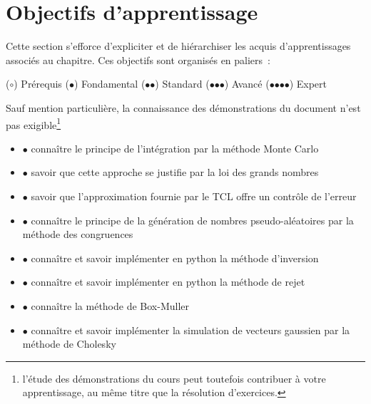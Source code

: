 \chapter{Objectifs d'apprentissage}\label{V-objectifs-dapprentissage}

Cette section s'efforce d'expliciter et de hiérarchiser les acquis
d'apprentissages associés au chapitre. Ces objectifs sont organisés en
paliers~:

($\mathord{\boldsymbol{\circ}}$) Prérequis ($\mathord{\bullet}$)
Fondamental ($\mathord{\bullet}\mathord{\bullet}$) Standard
($\mathord{\bullet}\mathord{\bullet}\mathord{\bullet}$) Avancé
($\mathord{\bullet}\mathord{\bullet}\mathord{\bullet}\mathord{\bullet}$)
Expert

Sauf mention particulière, la connaissance des démonstrations du
document n'est pas exigible\footnote{l'étude des démonstrations du cours
  peut toutefois contribuer à votre apprentissage, au même titre que la
  résolution d'exercices.}

\label{V-intuxe9grale-de-monte-carlo}

\begin{itemize}
\tightlist
\item
  $\mathord{\bullet}$ connaître le principe de l'intégration par la
  méthode Monte Carlo
\item
  $\mathord{\bullet}$ savoir que cette approche se justifie par la loi
  des grands nombres
\item
  $\mathord{\bullet}$ savoir que l'approximation fournie par le TCL
  offre un contrôle de l'erreur
\end{itemize}

\label{V-guxe9nuxe9ration-de-nombres-pseudo-aluxe9atoires}

\begin{itemize}
\tightlist
\item
  $\mathord{\bullet}$ connaître le principe de la génération de nombres
  pseudo-aléatoires par la méthode des congruences
\end{itemize}

\label{V-muxe9thodes-de-simulation-de-v.a.}

\begin{itemize}
\tightlist
\item
  $\mathord{\bullet}$ connaître et savoir implémenter en python la
  méthode d'inversion
\item
  $\mathord{\bullet}$ connaître et savoir implémenter en python la
  méthode de rejet
\item
  $\mathord{\bullet}$ connaître la méthode de Box-Muller
\item
  $\mathord{\bullet}$ connaître et savoir implémenter la simulation de
  vecteurs gaussien par la méthode de Cholesky
\end{itemize}

